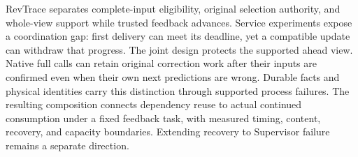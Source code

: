 RevTrace separates complete-input eligibility, original selection authority,
and whole-view support while trusted feedback advances. Service experiments
expose a coordination gap: first delivery can meet its deadline, yet a
compatible update can withdraw that progress. The joint design protects
the supported ahead view. Native full calls can retain original correction
work after their inputs are confirmed even when their own next predictions
are wrong. Durable facts and physical identities carry this distinction
through supported process failures. The resulting composition connects
dependency reuse to actual continued consumption under a fixed feedback
task, with measured timing, content, recovery, and capacity boundaries.
Extending recovery to Supervisor failure remains a separate direction.

